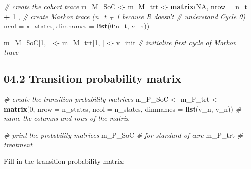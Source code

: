 \documentclass[]{article}
\newenvironment{Shaded}{\begin{snugshade}}{\end{snugshade}}
\newcommand{\KeywordTok}[1]{\textcolor[rgb]{0.13,0.29,0.53}{\textbf{#1}}}
\newcommand{\DataTypeTok}[1]{\textcolor[rgb]{0.13,0.29,0.53}{#1}}
\newcommand{\DecValTok}[1]{\textcolor[rgb]{0.00,0.00,0.81}{#1}}
\newcommand{\StringTok}[1]{\textcolor[rgb]{0.31,0.60,0.02}{#1}}
\newcommand{\CommentTok}[1]{\textcolor[rgb]{0.56,0.35,0.01}{\textit{#1}}}
\newcommand{\OtherTok}[1]{\textcolor[rgb]{0.56,0.35,0.01}{#1}}
\newcommand{\OperatorTok}[1]{\textcolor[rgb]{0.81,0.36,0.00}{\textbf{#1}}}
\newcommand{\NormalTok}[1]{#1}
\begin{document}
\begin{Shaded}
\begin{Highlighting}[]
\CommentTok{# create the cohort trace}
\NormalTok{m_M_SoC <-}\StringTok{ }\NormalTok{m_M_trt <-}\StringTok{  }\KeywordTok{matrix}\NormalTok{(}\OtherTok{NA}\NormalTok{, }
                              \DataTypeTok{nrow =}\NormalTok{ n_t }\OperatorTok{+}\StringTok{ }\DecValTok{1}\NormalTok{ ,  }\CommentTok{# create Markov trace (n_t + 1 because R doesn't }
                                                \CommentTok{# understand Cycle 0)}
                              \DataTypeTok{ncol =}\NormalTok{ n_states, }
                              \DataTypeTok{dimnames =} \KeywordTok{list}\NormalTok{(}\DecValTok{0}\OperatorTok{:}\NormalTok{n_t, v_n))}

\NormalTok{m_M_SoC[}\DecValTok{1}\NormalTok{, ] <-}\StringTok{ }\NormalTok{m_M_trt[}\DecValTok{1}\NormalTok{, ] <-}\StringTok{ }\NormalTok{v_init          }\CommentTok{# initialize first cycle of Markov trace}
\end{Highlighting}
\end{Shaded}

\subsection{04.2 Transition probability
matrix}\label{transition-probability-matrix}

\begin{Shaded}
\begin{Highlighting}[]
\CommentTok{# create the transition probability matrices}
\NormalTok{m_P_SoC  <-}\StringTok{ }\NormalTok{m_P_trt <-}\StringTok{ }\KeywordTok{matrix}\NormalTok{(}\DecValTok{0}\NormalTok{,}
                              \DataTypeTok{nrow =}\NormalTok{ n_states, }\DataTypeTok{ncol =}\NormalTok{ n_states,}
                              \DataTypeTok{dimnames =} \KeywordTok{list}\NormalTok{(v_n, v_n))  }\CommentTok{# name the columns and rows of the matrix }
                                               
\CommentTok{# print the probability matrices }
\NormalTok{m_P_SoC  }\CommentTok{# for standard of care}
\NormalTok{m_P_trt  }\CommentTok{# treatment}
\end{Highlighting}
\end{Shaded}

Fill in the transition probability matrix:
\end{document}
